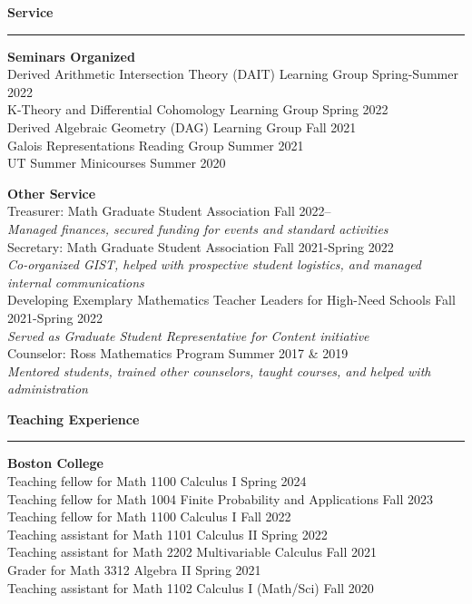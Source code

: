 \documentclass[11pt]{article}
\newenvironment{mysection}{
\color{mygreen}\bfseries\large
}
{
\\ \rule{\textwidth}{1pt}\hspace{-.25em}
} %
\begin{document}
\begin{mysection}Service \end{mysection}
\textbf{Seminars Organized} \\
Derived Arithmetic Intersection Theory (DAIT) Learning Group \hfill Spring-Summer 2022 \\
K-Theory and Differential Cohomology Learning Group \hfill Spring 2022 \\
Derived Algebraic Geometry (DAG) Learning Group \hfill Fall 2021 \\
Galois Representations Reading Group \hfill Summer 2021 \\
UT Summer Minicourses \hfill Summer 2020

\textbf{Other Service} \\
Treasurer: Math Graduate Student Association \hfill Fall 2022-- \\
\textit{Managed finances, secured funding for events and standard activities} \\
Secretary: Math Graduate Student Association \hfill Fall 2021-Spring 2022 \\
\textit{Co-organized GIST, helped with prospective student logistics, and managed internal communications} \\
Developing Exemplary Mathematics Teacher Leaders for High-Need Schools \hfill Fall 2021-Spring 2022\\
\textit{Served as Graduate Student Representative for Content initiative} \\
Counselor: Ross Mathematics Program \hfill Summer 2017 \& 2019 \\
\textit{Mentored students, trained other counselors, taught courses, and helped with administration} \\

\newpage

\begin{mysection}Teaching Experience\end{mysection}
\textbf{Boston College} \\
Teaching fellow for Math 1100 Calculus I \hfill Spring 2024 \\
Teaching fellow for Math 1004 Finite Probability and Applications \hfill Fall 2023 \\
Teaching fellow for Math 1100 Calculus I \hfill Fall 2022 \\
Teaching assistant for Math 1101 Calculus II \hfill Spring 2022 \\
Teaching assistant for Math 2202 Multivariable Calculus \hfill Fall 2021 \\
Grader for Math 3312 Algebra II \hfill Spring 2021 \\
Teaching assistant for Math 1102 Calculus I (Math/Sci) \hfill Fall 2020
\end{document}
